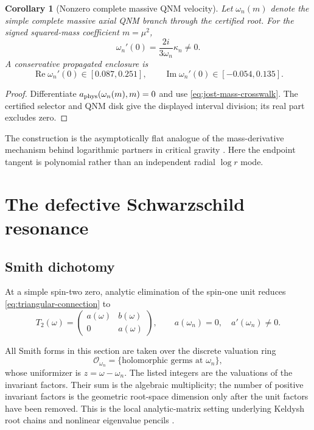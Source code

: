 \documentclass[11pt]{article}
\newtheorem{corollary}[theorem]{Corollary}
\theoremstyle{remark}
\begin{document}
\begin{corollary}[Nonzero complete massive QNM velocity]
\label{cor:mass-velocity}
Let \(\omega_n(m)\) denote the simple complete massive axial QNM branch
through the certified root.  For the signed squared-mass coefficient
\(m=\mu^2\),
\begin{equation}\label{eq:physical-mass-velocity}
 \boxed{\;
 \omega_n'(0)=\frac{2i}{3\omega_n}\kappa_n\ne0.
 \;}
\end{equation}
A conservative propagated enclosure is
\[
 \operatorname{Re}\omega_n'(0)\in[0.087,0.251],
 \qquad
 \operatorname{Im}\omega_n'(0)\in[-0.054,0.135].
\]
\end{corollary}

\begin{proof}
Differentiate
\(a_{\rm phys}(\omega_n(m),m)=0\) and use
\eqref{eq:jost-mass-crosswalk}.  The certified selector and QNM disk give
the displayed interval division; its real part excludes zero.
\end{proof}

The construction is the asymptotically flat analogue of the
mass-derivative mechanism behind logarithmic partners in critical gravity
\cite{lupope2011,bergshoeff2011}.  Here the endpoint tangent is polynomial
rather than an independent radial \(\log r\) mode.

\section{The defective Schwarzschild resonance}
\label{sec:qnm}

\subsection{Smith dichotomy}

At a simple spin-two zero, analytic elimination of the spin-one unit
reduces \eqref{eq:triangular-connection} to
\[
 T_2(\omega)=
 \begin{pmatrix}
 a(\omega)&b(\omega)\\
 0&a(\omega)
 \end{pmatrix},
\qquad
 a(\omega_n)=0,\quad a'(\omega_n)\ne0.
\]

All Smith forms in this section are taken over the discrete valuation ring
\[
 \mathcal O_{\omega_n}
 =\{\text{holomorphic germs at }\omega_n\},
\]
whose uniformizer is \(z=\omega-\omega_n\).  The listed integers are the
valuations of the invariant factors.  Their sum is the algebraic
multiplicity; the number of positive invariant factors is the geometric
root-space dimension only after the unit factors have been removed.
This is the local analytic-matrix setting underlying Keldysh root chains
and nonlinear eigenvalue pencils \cite{keldysh1951,gohberglancasterrodman}.
\end{document}

